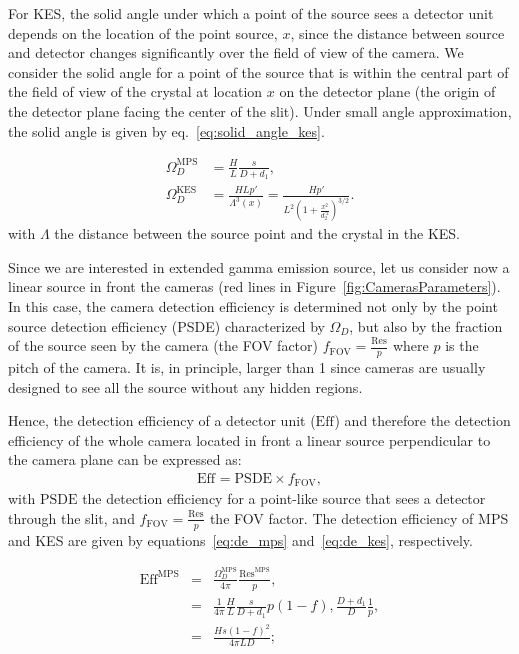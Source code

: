 \documentclass[a4paper,english,12pt]{article}
\newcommand\FOV{\textrm{Res}}
\newcommand\MPS{\textrm{MPS}}
\newcommand\KES{\textrm{KES}}
\newcommand\du{}
\newcommand\DE{\textrm{Eff}}
\begin{document}
For KES, the solid angle under which a point of the source sees a detector unit depends on the location of the point source, $x$, since the distance between source and detector changes significantly over the field of view of the camera. We
consider the solid angle for a point of the source that is within the central
part of the field of view of the crystal at location $x$ on the detector plane
(the origin of the detector plane facing the center of the slit). Under small
angle approximation, the solid angle is given by eq.~\ref{eq:solid_angle_kes}.

\begin{align}
  \Omega_D^{\MPS} & = \frac{H}{L} \frac{s}{D+d_1} \label{eq:solid_angle_mps}, \\
	\Omega_D^{\KES} & = \frac{H L p'}{\Lambda^3(x)} =  \frac{H p'}{L^2 \left( 1+\frac{x^2}{d_2^{'2}} \right)^{3/2}}. \label{eq:solid_angle_kes}
\end{align}
with $\Lambda$ the distance between the source point and the crystal in the KES.


Since we are interested in extended gamma emission source, let us consider now a linear source in front the cameras (red lines in Figure~\ref{fig:CamerasParameters}). In this case, the camera detection efficiency is determined not only by the point source detection efficiency (PSDE) characterized by $\Omega_D$, but also by the fraction of the source seen by the camera (the FOV factor) $f_{\textrm{FOV}} = \frac{\FOV_{\du}}{p}$ where $p$ is the pitch of the camera. It is, in principle, larger than 1 since cameras are usually designed to see all the source without any hidden regions.

Hence, the detection efficiency of a detector unit ($\DE_{\du}$) and therefore the detection efficiency of the whole camera located in front a linear source perpendicular to  the camera plane can be expressed as:
\begin{align}
	\DE_{\du} = \textrm{PSDE} \times f_{\textrm{FOV}},
\end{align}
with $\textrm{PSDE}$ the detection efficiency for a point-like source that sees a detector through the slit, and $f_{\textrm{FOV}} = \frac{\FOV_{\du}}{p}$ the FOV factor. The detection efficiency of MPS and KES are given by equations~\ref{eq:de_mps} and~\ref{eq:de_kes}, respectively.

\begin{eqnarray}
  \label{eq:de_mps}
  \DE_{\du}^{\MPS} & = & \frac{\Omega_D^{\MPS}}{4\pi} \frac{\FOV_{\du}^{\MPS}}{p}, \nonumber\\
                & = & \frac{1}{4\pi} \frac{H}{L} \frac{s}{D+d_1} p(1-f),
                      \frac{D+d_1}{D} \frac{1}{p} ,\nonumber\\
                & = & \frac{Hs(1-f)^2}{4 \pi L D} ;
\end{eqnarray}
\end{document}
